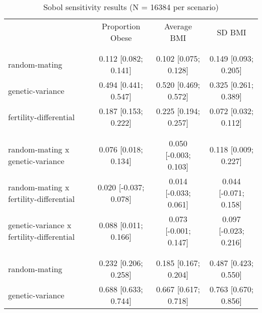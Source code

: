 
\begin{table}[htp]
\renewcommand{\arraystretch}{1.3}
\setlength{\tabcolsep}{5pt}
\caption{Sobol sensitivity results (N = 16384 per scenario)}
\label{tab:sobol}
\footnotesize
\centering
\begin{threeparttable}
\begin{tabular}{lccc}
\hline
\addlinespace
& Proportion Obese & Average BMI & SD BMI \\
\addlinespace
\hline
\addlinespace
\multicolumn{4}{l}{\textbf{Scenario 1 (only genes)}} \\
\addlinespace[6pt]
\multicolumn{4}{l}{\hspace{1em} S1} \\
\hspace{1.5em} random-mating & 0.112 [0.082; 0.141]   & 0.102 [0.075; 0.128]   & 0.149 [0.093; 0.205] \\
	  \hspace{1.5em} genetic-variance & 0.494 [0.441; 0.547]   & 0.520 [0.469; 0.572]   & 0.325 [0.261; 0.389] \\
	  \hspace{1.5em} fertility-differential & 0.187 [0.153; 0.222]   & 0.225 [0.194; 0.257]   & 0.072 [0.032; 0.112] \\
	 \\
\addlinespace[12pt]
\multicolumn{4}{l}{\hspace{1em} S2} \\ 
\hspace{1.5em} random-mating x genetic-variance & 0.076 [0.018; 0.134]   & 0.050 [-0.003; 0.103]   & 0.118 [0.009; 0.227] \\
	  \hspace{1.5em} random-mating x fertility-differential & 0.020 [-0.037; 0.078]   & 0.014 [-0.033; 0.061]   & 0.044 [-0.071; 0.158] \\
	  \hspace{1.5em} genetic-variance x fertility-differential & 0.088 [0.011; 0.166]   & 0.073 [-0.001; 0.147]   & 0.097 [-0.023; 0.216] \\
	 \\
\addlinespace[12pt]
\multicolumn{4}{l}{\hspace{1em} ST} \\ 
\hspace{1.5em} random-mating & 0.232 [0.206; 0.258]   & 0.185 [0.167; 0.204]   & 0.487 [0.423; 0.550] \\
	  \hspace{1.5em} genetic-variance & 0.688 [0.633; 0.744]   & 0.667 [0.617; 0.718]   & 0.763 [0.670; 0.856] \\

\end{tabular}
\end{threeparttable}
\end{table}
